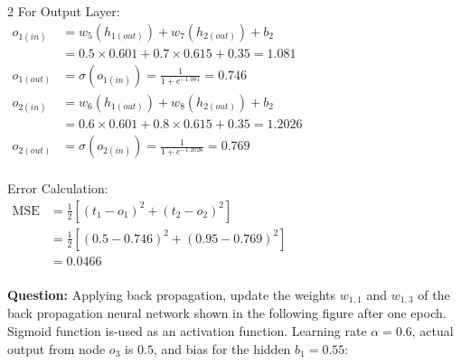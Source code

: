 \begin{multicols}{2}
\vspace{1em}
For Output Layer:\\[0.5em]
$\begin{aligned}
   o_{1(in)} &= w_5(h_{1(out)}) + w_7(h_{2(out)}) + b_2\\
   &= 0.5 \times 0.601 + 0.7 \times 0.615 + 0.35 = 1.081\\
   o_{1(out)} &= \sigma(o_{1(in)}) = \frac{1}{1 + e^{-1.081}} = 0.746
   \\[1em]
   o_{2(in)} &= w_6(h_{1(out)}) + w_8(h_{2(out)}) + b_2\\
   &= 0.6 \times 0.601 + 0.8 \times 0.615 + 0.35 = 1.2026\\
   o_{2(out)} &= \sigma(o_{2(in)}) = \frac{1}{1 + e^{-1.2026}} = 0.769\\
\end{aligned}$

\vspace{1em}
Error Calculation:\\[0.5em]
$\begin{aligned}
   \text{MSE} &= \frac{1}{2} \left[ (t_1 - o_1)^2 + (t_2 - o_2)^2 \right]\\
   &= \frac{1}{2} \left[ (0.5-0.746)^2 + (0.95-0.769)^2 \right]\\
   &= 0.0466\\
\end{aligned}$

\textbf{Question:} 
Applying back propagation, update the weights $w_{1,1}$ and $w_{1,3}$ of the back propagation neural network shown in the following figure after one epoch. Sigmoid function is-used as an activation function. Learning rate $\alpha=0.6$, actual output from node $o_3$ is $0.5$, and bias for the hidden $b_1=0.55$:


\end{multicols}
